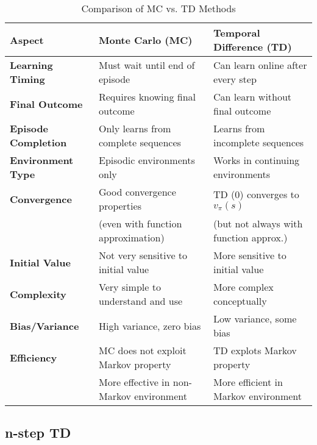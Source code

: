 \begin{table}[H]
    \centering
    \caption{Comparison of MC vs. TD Methods}
    \begin{tabular}{|l|p{6cm}|p{6cm}|}
        \hline
        \textbf{Aspect}             & \textbf{Monte Carlo (MC)}                & \textbf{Temporal Difference (TD)}      \\
        \hline
        \textbf{Learning Timing}    & Must wait until end of episode           & Can learn online after every step      \\
        \hline
        \textbf{Final Outcome}      & Requires knowing final outcome           & Can learn without final outcome        \\
        \hline
        \textbf{Episode Completion} & Only learns from complete sequences      & Learns from incomplete sequences       \\
        \hline
        \textbf{Environment Type}   & Episodic environments only               & Works in continuing environments       \\
        \hline
        \textbf{Convergence}        & Good convergence properties              & TD (0) converges to $v_\pi(s)$         \\
                                    & (even with function approximation)       & (but not always with function approx.) \\
        \hline
        \textbf{Initial Value}      & Not very sensitive to initial value      & More sensitive to initial value        \\
        \hline
        \textbf{Complexity}         & Very simple to understand and use        & More complex conceptually              \\
        \hline
        \textbf{Bias/Variance}      & High variance, zero bias                 & Low variance, some bias                \\
        \hline
        \textbf{Efficiency}         & MC does not exploit Markov property      & TD explots Markov property             \\
                                    & More effective in non-Markov environment & More efficient in Markov environment   \\
        \hline
    \end{tabular}
\end{table}

\subsection{n-step TD}

